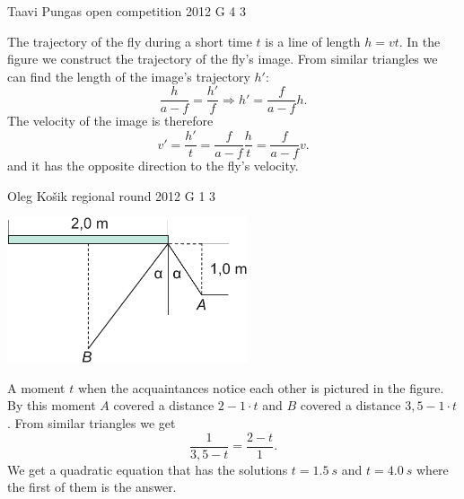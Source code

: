 \documentclass[11pt]{article}
\begin{document}
{Taavi Pungas} %
{open competition} %
{2012} %
{G 4} %
{3} %
{

\ifEngSolution
The trajectory of the fly during a short time $t$ is a line of length $h=vt$. In the figure we construct the trajectory of the fly’s image. From similar triangles we can find the length of the image’s trajectory $h'$:
$$\frac{h}{a-f}=\frac{h'}{f} \Rightarrow h'=\frac{f}{a-f} h.$$ 
The velocity of the image is therefore
$$v' = \frac{h'}{t} = \frac{f}{a-f} \frac{h}{t} = \frac{f}{a-f} v. $$ 
and it has the opposite direction to the fly’s velocity.
\fi
}

{Oleg Košik} %
{regional round} %
{2012} %
{G 1} %
{3} %
{

\ifEngSolution
\begin{center}
\includegraphics[width=200pt]{2012-v2g-01-peegel_lah}
\end{center}
A moment $t$ when the acquaintances notice each other is pictured in the figure. By this moment $A$ covered a distance $2-1\cdot t$ and $B$ covered a distance $3,5-1\cdot t$. From similar triangles we get
\[
\frac{1}{3,5-t}=\frac{2-t}{1}.
\] 
We get a quadratic equation that has the solutions $t=\SI{1,5}{s}$ and $t=\SI{4,0}{s}$ where the first of them is the answer.
\fi
}
\end{document}
